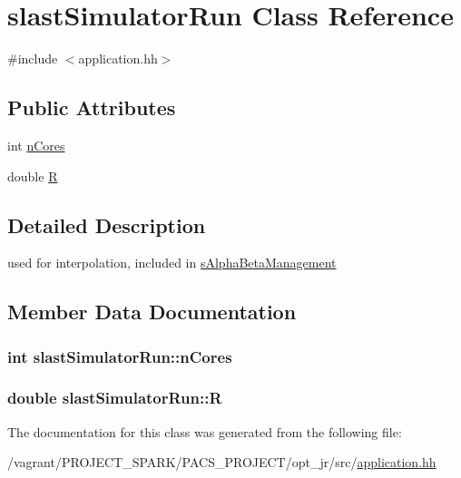 \hypertarget{classslastSimulatorRun}{\section{slast\-Simulator\-Run Class Reference}
\label{classslastSimulatorRun}
}


{\ttfamily \#include $<$application.\-hh$>$}

\subsection*{Public Attributes}
\begin{DoxyCompactItemize}
\item 
int \hyperlink{classslastSimulatorRun_a709891b6cab0506a591c1979f1001561}{n\-Cores}
\item 
double \hyperlink{classslastSimulatorRun_a0f5480e725b0d25893d8b983d5971d5e}{R}
\end{DoxyCompactItemize}


\subsection{Detailed Description}
used for interpolation, included in \hyperlink{classsAlphaBetaManagement}{s\-Alpha\-Beta\-Management} 

\subsection{Member Data Documentation}
\hypertarget{classslastSimulatorRun_a709891b6cab0506a591c1979f1001561}{
\subsubsection[{n\-Cores}]{\setlength{\rightskip}{0pt plus 5cm}int slast\-Simulator\-Run\-::n\-Cores}}\label{classslastSimulatorRun_a709891b6cab0506a591c1979f1001561}
\hypertarget{classslastSimulatorRun_a0f5480e725b0d25893d8b983d5971d5e}{
\subsubsection[{R}]{\setlength{\rightskip}{0pt plus 5cm}double slast\-Simulator\-Run\-::\-R}}\label{classslastSimulatorRun_a0f5480e725b0d25893d8b983d5971d5e}


The documentation for this class was generated from the following file\-:\begin{DoxyCompactItemize}
\item 
/vagrant/\-P\-R\-O\-J\-E\-C\-T\-\_\-\-S\-P\-A\-R\-K/\-P\-A\-C\-S\-\_\-\-P\-R\-O\-J\-E\-C\-T/opt\-\_\-jr/src/\hyperlink{application_8hh}{application.\-hh}\end{DoxyCompactItemize}
